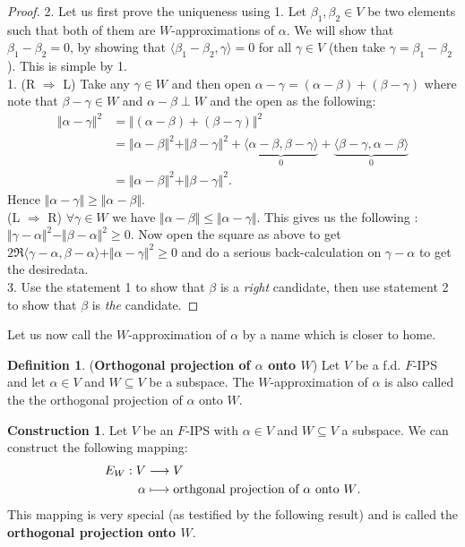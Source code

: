 \documentclass[letterpaper,11pt,twoside]{article}
\theoremstyle{definition}
\theoremstyle{definition}
\newtheorem{definition}[proposition]{Definition}
\theoremstyle{definition}
\theoremstyle{definition}
\theoremstyle{definition}
\newtheorem{construct}[proposition]{\textbf{Construction}}
\theoremstyle{definition}
\theoremstyle{remark}
\theoremstyle{definition}
\newcommand{\ip}[2]{\langle #1,#2 \rangle}
\newcommand{\norm}[1]{\Vert #1 \Vert}
\begin{document}
 	\begin{proof}
 		2. Let us first prove the uniqueness using 1. Let $ \beta_1,\beta_2 \in V $ be two elements such that both of them are $ W $-approximations of $ \alpha $. We will show that $ \beta_1-\beta_2 = 0$, by showing that $ \ip{\beta_1-\beta_2}{\gamma} = 0 $ for all $ \gamma \in V $ (then take $ \gamma = \beta_1-\beta_2 $). This is simple by 1.\\
 		1. (R $ \Rightarrow$ L) Take any $ \gamma \in W $ and then open $ \alpha - \gamma = (\alpha - \beta) + (\beta - \gamma) $ where note that $ \beta - \gamma \in  W$ and $ \alpha - \beta \perp W$ and the open as the following:
 		\begin{align*}
 			\norm{\alpha - \gamma}^{2} &=  \norm{ (\alpha - \beta) + (\beta- \gamma) }^{2}\\
 			&= \norm{\alpha - \beta}^{2} + \norm{\beta-\gamma}^{2} + \underbrace{\ip{\alpha - \beta}{\beta-\gamma}}_{0} + \underbrace{\ip{\beta- \gamma}{\alpha - \beta}}_{0}\\
 			&= \norm{\alpha - \beta}^{2} + \norm{\beta-\gamma}^{2}.
 		\end{align*}
 		Hence $ \norm{\alpha - \gamma} \ge \norm{\alpha -\beta} $.\\
 		(L $ \Rightarrow $ R) $ \forall \gamma \in W $ we have $ \norm{\alpha - \beta} \le \norm{\alpha - \gamma}  $. This gives us the following : $ \norm{\gamma - \alpha}^{2} -\norm{\beta - \alpha} ^{2} \ge 0$. Now open the square as above to get $ 2 \Re{\ip{\gamma-\alpha}{\beta - \alpha}} + \norm{\alpha - \gamma}^{2} \ge 0$ and do a serious back-calculation on $ \gamma -\alpha $ to get the desiredata.\\
 		3. Use the statement 1 to show that $ \beta $ is a \textit{right} candidate, then use statement 2 to show that $ \beta $ is \textit{the} candidate.
 	\end{proof}
 	Let us now call the $ W $-approximation of $ \alpha $ by a name which is closer to home.
 	\begin{definition}
 		(\textbf{Orthogonal projection of $ \alpha $ onto $ W $}) Let $ V $ be a f.d. $ F $-IPS and let $ \alpha \in V $ and $ W\subseteq V $ be a subspace. The $ W $-approximation of $ \alpha $ is also called the the orthogonal projection of $ \alpha $ onto $ W $.
 	\end{definition}
    \begin{construct}
    	Let $ V $ be an $ F $-IPS with $ \alpha \in V $ and $ W\subseteq V $ a subspace. We can construct the following mapping:
    	\begin{align*}
    		E_W : V&\longrightarrow V\\
    				\alpha &\longmapsto \text{orthgonal projection of $ \alpha $ onto $ W $}.
    	\end{align*}
    	This mapping is very special (as testified by the following result) and is called the \textbf{orthogonal projection onto $ W $}.
    \end{construct}
\end{document}
